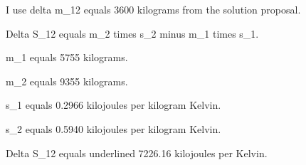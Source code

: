I use delta m_12 equals 3600 kilograms from the solution proposal.

Delta S_12 equals m_2 times s_2 minus m_1 times s_1.

m_1 equals 5755 kilograms.

m_2 equals 9355 kilograms.

s_1 equals 0.2966 kilojoules per kilogram Kelvin.

s_2 equals 0.5940 kilojoules per kilogram Kelvin.

Delta S_12 equals underlined 7226.16 kilojoules per Kelvin.